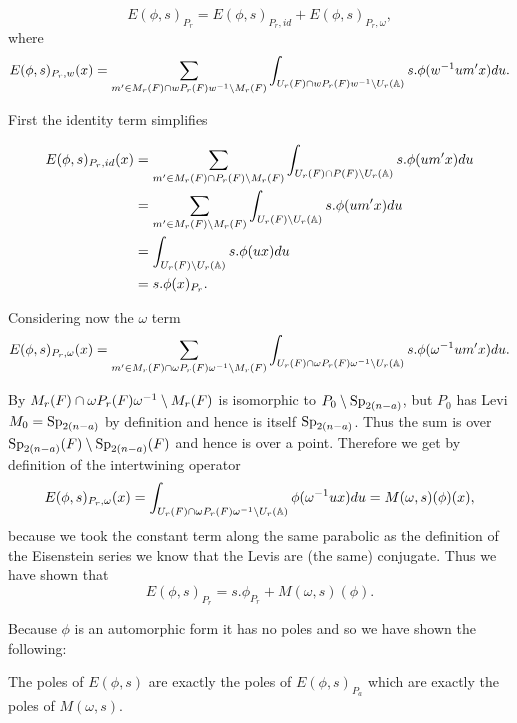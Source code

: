      \[E(\phi, s)_{P_r} = E(\phi, s)_{P_r, id} + E(\phi, s)_{P_r, \omega},\]
     where 
     \[E(\phi, s)_{P_r, w}(x) =  \sum_{m'\in M_r(F)\cap wP_r(F)w\inv\setminus M_r(F)} \int_{U_r(F)\cap wP_r(F)w\inv \setminus U_r(\A)} s.\phi( w\inv um' x)  du.\]

First the identity term simplifies

     \begin{equation*}
        \begin{aligned}
            E(\phi, s)_{P_r, id} (x)&=  \sum_{m'\in M_r(F)\cap P_r(F)\setminus M_r(F)} \int_{U_r(F)\cap P(F) \setminus U_r(\A)} s.\phi( um' x)  du\\
            &= \sum_{m'\in M_r(F)\setminus M_r(F)} \int_{U_r(F)\setminus U_r(\A)} s.\phi( um' x)  du \\
            &=\int_{U_r(F)\setminus U_r(\A)} s.\phi( u x)  du \\
            &= s.\phi(x)_{P_r}.
        \end{aligned}
     \end{equation*}

     Considering now the \(\omega\) term 
     \[E(\phi, s)_{P_r, \omega}(x) =  \sum_{m'\in M_r(F)\cap \omega P_r(F)\omega\inv\setminus M_r(F)} \int_{U_r(F)\cap \omega P_r(F)\omega\inv \setminus U_r(\A)} s.\phi( \omega\inv um' x)  du.\]

     By \cite[2C]{jiangPolesCertainResidual2013} \(M_r(F)\cap \omega P_r(F)\omega^{-1} \setminus M_r(F)\) is isomorphic to \(P_0 \setminus \operatorname{Sp}_{2(n-a)}\), but \(P_0\) has Levi \(M_0 = \operatorname{Sp}_{2(n-a)}\) by definition and hence is itself \(\operatorname{Sp}_{2(n-a)}\). Thus the sum is over \(\operatorname{Sp}_{2(n-a)}(F) \setminus \operatorname{Sp}_{2(n-a)}(F)\) and hence is over a point. Therefore we get by definition of the intertwining operator
     \[E(\phi, s)_{P_r, \omega}(x) = \int_{U_r(F)\cap \omega P_r(F)\omega\inv \setminus U_r(\A)} \phi( \omega\inv u x)  du = M(\omega, s)(\phi)(x),\]
     because we took the constant term along the same parabolic as the definition of the Eisenstein series we know that the Levis are (the same) conjugate.
    Thus we have shown that 
    \[E(\phi, s)_{P_r} = s.\phi_{P_r} + M(\omega, s )(\phi).\]
    
    Because \(\phi\) is an automorphic form it has no poles and so we have shown the following:
    \begin{Lemma}
        The poles of \(E(\phi, s)\) are exactly the poles of \(E(\phi,s)_{P_a}\) which are exactly the poles of \(M(\omega, s)\).
    \end{Lemma}
    

